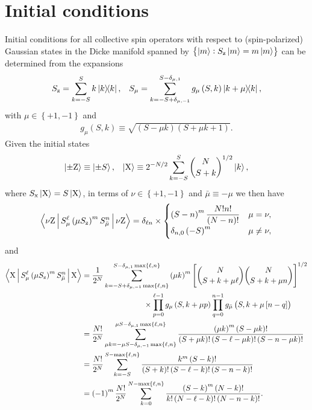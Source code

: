 \documentclass[pra,reprint,longbibliography]{revtex4-1}
\newcommand{\f}[2]{\dfrac{#1}{#2}} %
\newcommand{\p}[1]{\left(#1\right)} %
\renewcommand{\sp}[1]{\left[#1\right]} %
\renewcommand{\set}[1]{\left\{#1\right\}} %
\newcommand{\bk}{\Braket} %
\newcommand{\z}{\text{z}}
\newcommand{\x}{\text{x}}
\newcommand{\Z}{\text{Z}}
\newcommand{\X}{\text{X}}
\newcommand{\bmu}{{\bar\mu}}
\newcommand{\1}{\mathds{1}}
\begin{document}
\section{Initial conditions}
\label{sec:initial_conditions}

Initial conditions for all collective spin operators with respect to
(spin-polarized) Gaussian states in the Dicke manifold spanned by
$\set{\ket{m}:S_\z\ket{m}=m\ket{m}}$ can be determined from the
expansions
\begin{align}
  S_\z = \sum_{k=-S}^S k \op{k},
  &&
  S_\mu = \sum_{k=-S+\delta_{\mu,-1}}^{S-\delta_{\mu,1}}
  g_\mu\p{S,k} \op{k+\mu}{k},
\end{align}
with $\mu\in\set{+1,-1}$ and
\begin{align}
  g_\mu\p{S,k} \equiv \sqrt{\p{S-\mu k}\p{S+\mu k+1}}.
\end{align}
Given the initial states
\begin{align}
  \ket{\pm\Z} \equiv \ket{\pm S},
  &&
  \ket{\X} \equiv 2^{-N/2} \sum_{k=-S}^S
  { N \choose S+k }^{1/2} \ket{k},
\end{align}
where $S_\x\ket{\X}=S\ket{\X}$, in terms of $\nu\in\set{+1,-1}$ and
$\bmu\equiv-\mu$ we then have
\begin{align}
  \bk{\nu\Z|S_\mu^\ell \p{\mu S_\z}^m S_\bmu^n|\nu\Z}
  = \delta_{\ell n} \times
  \begin{cases}
     \p{S-n}^m \f{N! n!}{\p{N-n}!} & \mu = \nu, \\
     \delta_{n,0} \p{-S}^m & \mu \ne \nu,
  \end{cases}
\end{align}
and
\begin{align}
  \bk{\X|S_\mu^\ell \p{\mu S_\z}^m S_\bmu^n|\X}
  &=  \f1{2^N} \sum_{k=-S+\delta_{\mu,-1}\max\set{\ell,n}}
  ^{S-\delta_{\mu,1}\max\set{\ell,n}} \p{\mu k}^m
  \sp{{ N \choose S+k+\mu\ell } { N \choose S+k+\mu n }}^{1/2}
  \notag \\
  &\qquad\qquad\qquad\qquad
  \times \prod_{p=0}^{\ell-1} g_\mu\p{S,k+\mu p}
  \prod_{q=0}^{n-1} g_\bmu\p{S,k+\mu\sp{n-q}} \\
  &= \f{N!}{2^N} \sum_{\mu k=-\mu S-\delta_{\mu,-1}\max\set{\ell,n}}
  ^{\mu S-\delta_{\mu,1}\max\set{\ell,n}}
  \f{\p{\mu k}^m \p{S-\mu k}!}
  {\p{S+\mu k}!\p{S-\ell-\mu k}!\p{S-n-\mu k}!} \\
  &= \f{N!}{2^N} \sum_{k=-S}^{S-\max\set{\ell,n}}
  \f{k^m \p{S-k}!}{\p{S+k}!\p{S-\ell-k}!\p{S-n-k}!} \\
  &= \p{-1}^m\f{N!}{2^N} \sum_{k=0}^{N-\max\set{\ell,n}}
  \f{\p{S-k}^m \p{N-k}!}{k!\p{N-\ell-k}!\p{N-n-k}!}.
\end{align}
\end{document}
